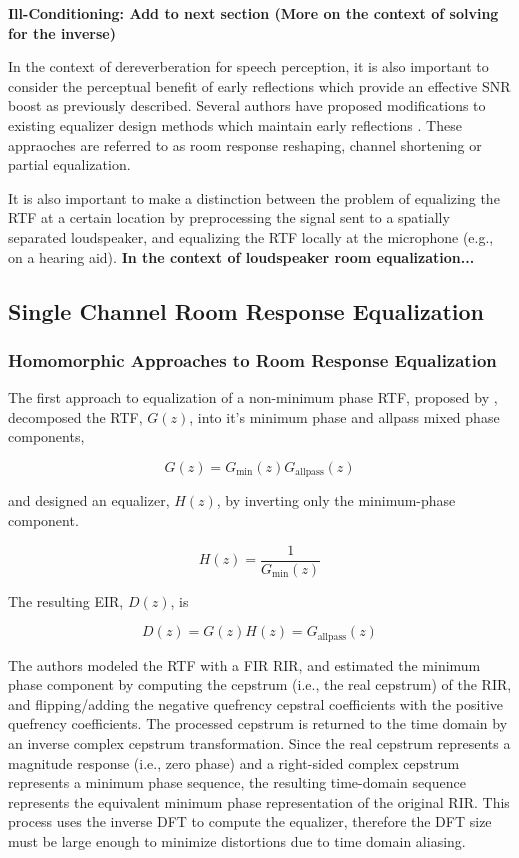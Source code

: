 \textbf{Ill-Conditioning: Add to next section (More on the context of solving for the inverse)}

In the context of dereverberation for speech perception, it is also important to consider the perceptual benefit of early reflections which provide an effective SNR boost as previously described. Several authors have proposed modifications to existing equalizer design methods which maintain early reflections \citep{karjalainen2006equalization, maamar2006partial, mei2009room}. These appraoches are referred to as room response reshaping, channel shortening or partial equalization.

It is also important to make a distinction between the problem of equalizing the RTF at a certain location by preprocessing the signal sent to a spatially separated loudspeaker, and equalizing the RTF locally at the microphone (e.g., on a hearing aid). \textbf{In the context of loudspeaker room equalization...}

\subsection{Single Channel Room Response Equalization}

\subsubsection{Homomorphic Approaches to Room Response Equalization}

The first approach to equalization of a non-minimum phase RTF, proposed by \cite{neely1979invertibility}, decomposed the RTF, $G(z)$, into it's minimum phase and allpass mixed phase components, 

\begin{equation}
	G(z)=G_{\mathrm{min}}(z)G_{\mathrm{allpass}}(z)
\end{equation}

\noindent
and designed an equalizer, $H(z)$, by inverting only the minimum-phase component. 

\begin{equation}
	H(z)=\frac{1}{G_{\mathrm{min}}(z)}
\end{equation}

\noindent
The resulting EIR, $D(z)$, is

\begin{equation}
	D(z)=G(z)H(z)=G_{\mathrm{allpass}}(z)
\end{equation}

The authors modeled the RTF with a FIR RIR, and estimated the minimum phase component by computing the cepstrum (i.e., the real cepstrum) of the RIR, and flipping/adding the negative quefrency cepstral coefficients with the positive quefrency coefficients. The processed cepstrum is returned to the time domain by an inverse complex cepstrum transformation. Since the real cepstrum represents a magnitude response (i.e., zero phase) and a right-sided complex cepstrum represents a minimum phase sequence, the resulting time-domain sequence represents the equivalent minimum phase representation of the original RIR. This process uses the inverse DFT to compute the equalizer, therefore the DFT size must be large enough to minimize distortions due to time domain aliasing. 

